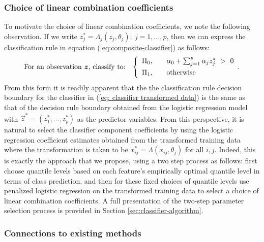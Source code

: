 \subsubsection{Choice of linear combination coefficients}
\label{sec:variable-coefficients}

To motivate the choice of linear combination coefficients, we note the following
observation.  If we write
$z_j^{*} = \Lambda_j (z_j, \theta_j);~ j = 1, \dots, p$, then we can express the
classification rule in equation (\ref{eq:composite-classifier}) as follows:
\begin{equation}
  \label{eq: classifier transformed data}
  \text{For an observation $\vec{z}$, classify to:} \hspace{3mm} \left\{ 
    \begin{array}{lcl}
      \Pi_0, & & \alpha_0 + \sum_{j = 1}^p \alpha_j z_j^{*} ~>~ 0 \\[1ex]
      \Pi_1, & & \text{otherwise} \\[0ex]
    \end{array} .
  \right.
\end{equation}
From this form it is readily apparent that the the classification rule decision
boundary for the classifier in (\ref{eq: classifier transformed data}) is the
same as that of the decision rule boundary obtained from the logistic regression
model with $\vec{z}^{*} = (z_1^{*}, \dots, z_p^{*})$ as the predictor variables.
From this perspective, it is natural to select the classifier component
coefficients by using the logistic regression coefficient estimates obtained
from the transformed training data where the transformation is taken to be
$x_{ij}^{*} = \Lambda(x_{ij}, \theta_j)$ for all $i, j$.  Indeed, this is
exactly the approach that we propose, using a two step process as follows: first
choose quantile levels based on each feature's empirically optimal quantile
level in terms of class prediction, and then for these fixed choices of quantile
levels use penalized logistic regression on the transformed training data to
select a choice of linear combination coefficients.  A full presentation of the
two-step parameter selection process is provided in Section
\ref{sec:classifier-algorithm}.




\subsubsection{Connections to existing methods}
\label{sec:similarities-to-existing}

